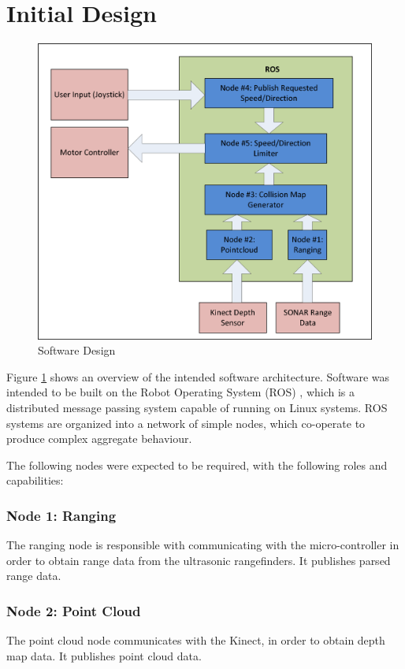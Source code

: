 \documentclass[oneside,final,a4paper]{report}
\begin{document}
\section{Initial Design}
\begin{figure}[hbt]
 \centering
 \includegraphics[scale=0.9]{Software_Diagram}
 \caption{Software Design}\label{fig:software}
\end{figure}

Figure \ref{fig:software} shows an overview of the intended software architecture.  Software was intended to be built on the Robot Operating System (ROS) \cite{ROS}, which is a distributed message passing system capable of running on Linux systems.  ROS systems are organized into a network of simple nodes, which co-operate to produce complex aggregate behaviour. 

The following nodes were expected to be required, with the following roles and capabilities:

\subsubsection{Node 1: Ranging}
The ranging node is responsible with communicating with the micro-controller in order to obtain range data from the ultrasonic rangefinders.  It publishes parsed range data.

\subsubsection{Node 2: Point Cloud}
The point cloud node communicates with the Kinect, in order to obtain depth map data.  It publishes point cloud data.
\end{document}
